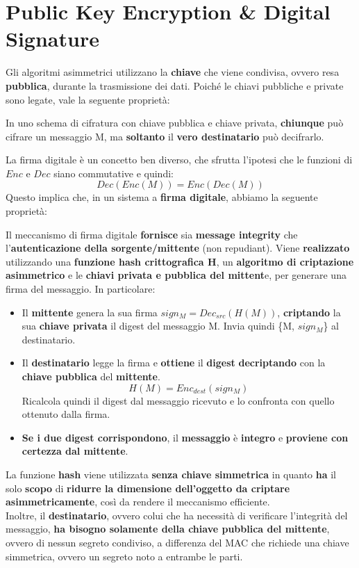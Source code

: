 \section{Public Key Encryption \& Digital Signature}
Gli algoritmi asimmetrici utilizzano la \textbf{chiave} che viene condivisa, ovvero resa \textbf{pubblica}, durante la trasmissione dei dati. Poiché le chiavi pubbliche e private sono legate, vale la seguente proprietà:
\begin{proposition}
In uno schema di cifratura con chiave pubblica e chiave privata, \textbf{chiunque} può cifrare un messaggio M, ma \textbf{soltanto} il \textbf{vero destinatario} può decifrarlo.
\end{proposition}
La firma digitale è un concetto ben diverso, che sfrutta l'ipotesi che le funzioni di $Enc$ e $Dec$ siano commutative e quindi:
\begin{equation}\label{eq:commut}
    Dec(Enc(M)) = Enc(Dec(M))
\end{equation}
Questo implica che, in un sistema a \textbf{firma digitale}, abbiamo la seguente proprietà:
\begin{proposition}
Il meccanismo di firma digitale \textbf{fornisce} sia\textbf{ message integrity} che l’\textbf{autenticazione della sorgente/mittente} (non repudiant). Viene \textbf{realizzato} utilizzando una \textbf{funzione hash crittografica H}, un \textbf{algoritmo di criptazione asimmetrico} e le \textbf{chiavi privata e pubblica del mittent}e, per generare una firma del messaggio. In particolare:
\begin{itemize}
    \item Il \textbf{mittente} genera la sua firma $sign_M=Dec_{src}(H(M))$, \textbf{criptando} la sua \textbf{chiave privata} il digest del messaggio M. Invia quindi \{M, $sign_M$\} al destinatario.
    \item Il \textbf{destinatario} legge la firma e \textbf{ottiene} il \textbf{digest} \textbf{decriptando} con la \textbf{chiave pubblica} del \textbf{mittente}.
    \[H(M)=Enc_{dest}(sign_M)\]
    Ricalcola quindi il digest dal messaggio ricevuto e lo confronta con quello ottenuto dalla firma.
    \item \textbf{Se i due digest corrispondono}, il \textbf{messaggio} è \textbf{integro} e \textbf{proviene con certezza dal mittente}.
\end{itemize}
\end{proposition}
\begin{note}
La funzione \textbf{hash} viene utilizzata\textbf{ senza chiave simmetrica} in quanto \textbf{ha} il solo \textbf{scopo} di \textbf{ridurre la dimensione dell’oggetto da criptare asimmetricamente}, così da rendere il meccanismo efficiente.\\
Inoltre, il \textbf{destinatario}, ovvero colui che ha necessità di verificare l’integrità del messaggio, \textbf{ha bisogno solamente della chiave pubblica del mittente}, ovvero di nessun segreto condiviso, a differenza del MAC che richiede una chiave simmetrica, ovvero un segreto noto a entrambe le parti.
\end{note}
